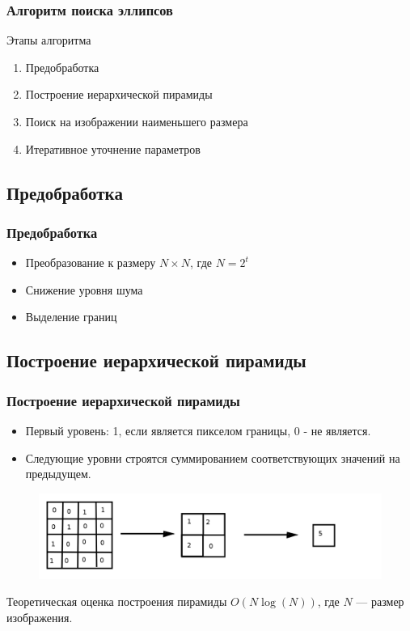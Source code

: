\documentclass[14pt]{beamer}
\begin{document}
\begin{frame}
\frametitle{Алгоритм поиска эллипсов}
\begin{block}{Этапы алгоритма}
\begin{enumerate}
  \item Предобработка
  \item Построение иерархической пирамиды
  \item Поиск на изображении наименьшего размера
  \item Итеративное уточнение параметров
\end{enumerate}
\end{block}
\end{frame}

\subsection{Предобработка}
\begin{frame}
\frametitle{Предобработка}
\begin{block}{}
\begin{itemize}
  \item Преобразование к размеру $N \times N$, где $N = 2^t$
  \item Снижение уровня шума
  \item Выделение границ
\end{itemize}
\end{block}
\end{frame}

\subsection{Построение иерархической пирамиды}
\begin{frame}
\frametitle{Построение иерархической пирамиды}
\begin{block}{}
\begin{itemize}
  \item Первый уровень: 1, если является пикселом границы, 0 - не является.
  \item Следующие уровни строятся суммированием соответствующих значений на предыдущем.
\end{itemize}
\end{block}
\begin{figure}[H]
  \center
  \includegraphics[width=0.7\linewidth]{pyramidcreation}
\end{figure}
\begin{block}{Теоретическая оценка построения пирамиды}
$O(N\log(N))$, где $N$ --- размер изображения.
\end{block}
\end{frame}
\end{document}
